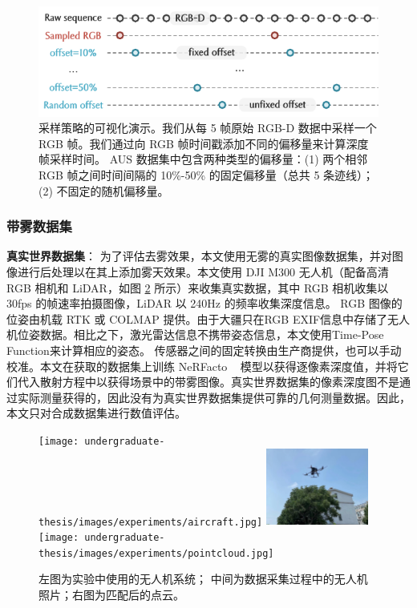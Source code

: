 \begin{figure}[ht]
    \centering
    \includegraphics[width=\textwidth]{undergraduate-thesis/images/experiments/offset.pdf}
    \caption{采样策略的可视化演示。我们从每 5 帧原始 RGB-D 数据中采样一个 RGB 帧。我们通过向 RGB 帧时间戳添加不同的偏移量来计算深度帧采样时间。 AUS 数据集中包含两种类型的偏移量：(1) 两个相邻 RGB 帧之间时间间隔的 10\%-50\% 的固定偏移量（总共 5 条迹线）； (2) 不固定的随机偏移量。}
    \label{fig:exp-aus-offset}
\end{figure}

\subsubsection{带雾数据集}
\textbf{真实世界数据集}：
为了评估去雾效果，本文使用无雾的真实图像数据集，并对图像进行后处理以在其上添加雾天效果。本文使用 DJI M300 无人机（配备高清 RGB 相机和 LiDAR，如图 \ref{fig:real-world-setting} 所示）来收集真实数据，其中 RGB 相机收集以 30fps 的帧速率拍摄图像，LiDAR 以 240Hz 的频率收集深度信息。 RGB 图像的位姿由机载 RTK 或 COLMAP 提供。由于大疆只在RGB EXIF信息中存储了无人机位姿数据。相比之下，激光雷达信息不携带姿态信息，本文使用Time-Pose Function来计算相应的姿态。
传感器之间的固定转换由生产商提供，也可以手动校准。本文在获取的数据集上训练 NeRFacto ~\cite{tancik_nerfstudio_2023} 模型以获得逐像素深度值，并将它们代入散射方程中以获得场景中的带雾图像。真实世界数据集的像素深度图不是通过实际测量获得的，因此没有为真实世界数据集提供可靠的几何测量数据。因此，本文只对合成数据集进行数值评估。

\begin{figure}[ht]
	\begin{center}
	\texttt{[image: undergraduate-thesis/images/experiments/aircraft.jpg]}
	\includegraphics[width=0.3\textwidth]{undergraduate-thesis/images/experiments/flight-near.jpg}
	\texttt{[image: undergraduate-thesis/images/experiments/pointcloud.jpg]}
	\end{center}
	\caption{左图为实验中使用的无人机系统； 中间为数据采集过程中的无人机照片；右图为匹配后的点云。}
	\label{fig:real-world-setting}
\end{figure}

